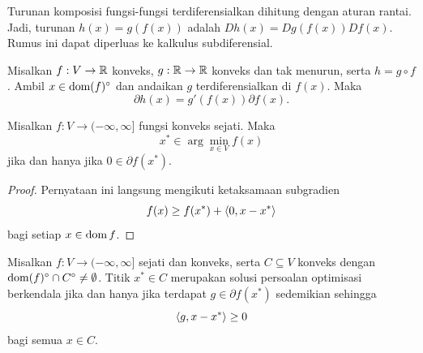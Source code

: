 Turunan komposisi fungsi-fungsi terdiferensialkan dihitung dengan aturan rantai. Jadi, turunan $h(x)=g(f(x))$ adalah $D h(x) = Dg(f(x))Df(x)$. Rumus ini dapat diperluas ke kalkulus subdiferensial.
\begin{theorem}
    Misalkan $f:V\rightarrow \mathbb{R}$ konveks, $g:\mathbb{R}\rightarrow \mathbb{R}$ konveks dan tak menurun, serta $h=g\circ f$. Ambil $x\in\operatorname{\mathrm{dom}}(f)^\circ$ dan andaikan $g$ terdiferensialkan di $f(x)$. Maka
    \[
        \partial h(x)= g'(f(x))\partial f(x).
    \]
\end{theorem}

\begin{theorem}
    Misalkan $f:V\to(-\infty, \infty]$ fungsi konveks sejati. Maka
    \[
        x^\ast\in\arg\min_{x\in V} f(x)
    \]
    jika dan hanya jika $0\in\partial f(x^\ast)$.
\end{theorem}
\begin{proof}
    Pernyataan ini langsung mengikuti ketaksamaan subgradien
    \[
        f(x)\geq f(x^\ast)+\left\langle0 , x-x^\ast\right\rangle
    \]
    bagi setiap $x\in\operatorname{\mathrm{dom}} f$.
\end{proof}

\begin{theorem}
    Misalkan $f:V\rightarrow(-\infty,\infty]$ sejati dan konveks, serta $C\subseteq V$ konveks dengan $\operatorname{\mathrm{dom}}(f)^\circ\cap C^\circ \neq\emptyset$. Titik $x^\ast\in C$ merupakan solusi persoalan optimisasi berkendala jika dan hanya jika terdapat $g\in \partial f(x^\ast)$ sedemikian sehingga
    \[
        \left\langle g , x-x^\ast\right\rangle\geq 0
    \]
    bagi semua $x\in C$.
\end{theorem}
